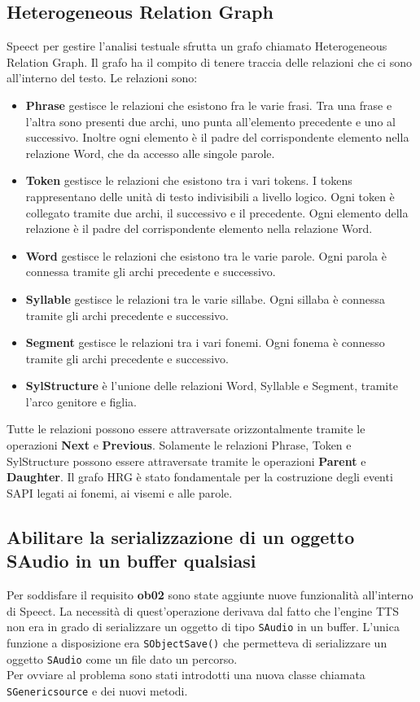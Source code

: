 \subsection{Heterogeneous Relation Graph}
Speect per gestire l'analisi testuale sfrutta un grafo chiamato Heterogeneous Relation Graph.
Il grafo ha il compito di tenere traccia delle relazioni che ci sono all'interno del testo.
Le relazioni sono:
\begin{itemize}
	\item \textbf{Phrase} gestisce le relazioni che esistono fra le varie frasi. Tra una frase e l'altra sono presenti due archi, uno punta all'elemento precedente e uno al successivo. Inoltre ogni elemento è il padre del corrispondente elemento nella relazione Word, che da accesso alle singole parole.   
	\item \textbf{Token} gestisce le relazioni che esistono tra i vari tokens. I tokens rappresentano delle unità di testo indivisibili a livello logico.
	Ogni token è collegato tramite due archi, il successivo e il precedente.
	Ogni elemento della relazione è il padre del corrispondente elemento nella relazione Word.
	\item \textbf{Word} gestisce le relazioni che esistono tra le varie parole. Ogni parola è connessa tramite gli archi precedente e successivo.
	\item \textbf{Syllable} gestisce le relazioni tra le varie sillabe. Ogni sillaba è connessa tramite gli archi precedente e successivo.
	\item \textbf{Segment} gestisce le relazioni tra i vari fonemi. Ogni fonema è connesso tramite gli archi precedente e successivo.
	\item \textbf{SylStructure} è l'unione delle relazioni Word, Syllable e Segment, tramite l'arco genitore e figlia.
\end{itemize}
Tutte le relazioni possono essere attraversate orizzontalmente tramite le operazioni \textbf{Next} e \textbf{Previous}.
Solamente le relazioni Phrase, Token e SylStructure possono essere attraversate tramite le operazioni \textbf{Parent} e \textbf{Daughter}.
Il grafo HRG è stato fondamentale per la costruzione degli eventi SAPI legati ai fonemi, ai visemi e alle parole.
\subsection{Abilitare la serializzazione di un oggetto SAudio in un buffer qualsiasi}
Per soddisfare il requisito \textbf{ob02} sono state aggiunte nuove funzionalità all'interno di Speect.
La necessità di quest'operazione derivava dal fatto che l'engine TTS non era in grado di serializzare un oggetto di tipo \texttt{SAudio} in un buffer.
L'unica funzione a disposizione era \texttt{SObjectSave()} che permetteva di serializzare un oggetto \texttt{SAudio} come un file dato un percorso.\\
Per ovviare al problema sono stati introdotti una nuova classe chiamata\\\texttt{SGenericsource} e dei nuovi metodi.
